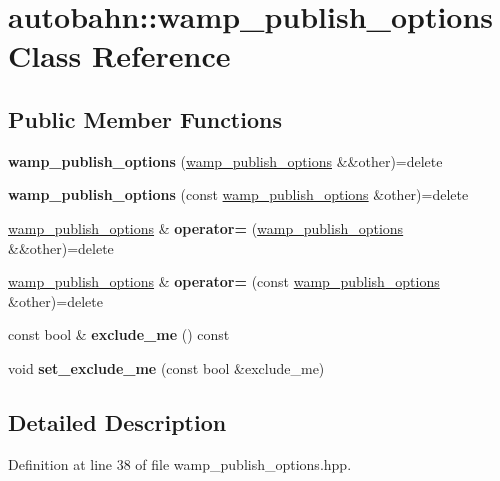 \hypertarget{classautobahn_1_1wamp__publish__options}{}\section{autobahn\+:\+:wamp\+\_\+publish\+\_\+options Class Reference}
\label{classautobahn_1_1wamp__publish__options}
\subsection*{Public Member Functions}
\begin{DoxyCompactItemize}
\item 
{\bfseries wamp\+\_\+publish\+\_\+options} (\hyperlink{classautobahn_1_1wamp__publish__options}{wamp\+\_\+publish\+\_\+options} \&\&other)=delete\hypertarget{classautobahn_1_1wamp__publish__options_afc0f11a40515cb77c1b423d5ec95ab18}{}\label{classautobahn_1_1wamp__publish__options_afc0f11a40515cb77c1b423d5ec95ab18}

\item 
{\bfseries wamp\+\_\+publish\+\_\+options} (const \hyperlink{classautobahn_1_1wamp__publish__options}{wamp\+\_\+publish\+\_\+options} \&other)=delete\hypertarget{classautobahn_1_1wamp__publish__options_a987eee20209a49ecf3480e9770c47931}{}\label{classautobahn_1_1wamp__publish__options_a987eee20209a49ecf3480e9770c47931}

\item 
\hyperlink{classautobahn_1_1wamp__publish__options}{wamp\+\_\+publish\+\_\+options} \& {\bfseries operator=} (\hyperlink{classautobahn_1_1wamp__publish__options}{wamp\+\_\+publish\+\_\+options} \&\&other)=delete\hypertarget{classautobahn_1_1wamp__publish__options_af2b4b7ff246e5c761ab5f7b2f84173ca}{}\label{classautobahn_1_1wamp__publish__options_af2b4b7ff246e5c761ab5f7b2f84173ca}

\item 
\hyperlink{classautobahn_1_1wamp__publish__options}{wamp\+\_\+publish\+\_\+options} \& {\bfseries operator=} (const \hyperlink{classautobahn_1_1wamp__publish__options}{wamp\+\_\+publish\+\_\+options} \&other)=delete\hypertarget{classautobahn_1_1wamp__publish__options_ac9614a06cdd6dc90e3cb24a3a5833b8f}{}\label{classautobahn_1_1wamp__publish__options_ac9614a06cdd6dc90e3cb24a3a5833b8f}

\item 
const bool \& {\bfseries exclude\+\_\+me} () const \hypertarget{classautobahn_1_1wamp__publish__options_a7fb06211e7b0a2bab78742bb55b78ddb}{}\label{classautobahn_1_1wamp__publish__options_a7fb06211e7b0a2bab78742bb55b78ddb}

\item 
void {\bfseries set\+\_\+exclude\+\_\+me} (const bool \&exclude\+\_\+me)\hypertarget{classautobahn_1_1wamp__publish__options_aad04c3ddf7b784ca857d70db30ec7652}{}\label{classautobahn_1_1wamp__publish__options_aad04c3ddf7b784ca857d70db30ec7652}

\end{DoxyCompactItemize}


\subsection{Detailed Description}


Definition at line 38 of file wamp\+\_\+publish\+\_\+options.\+hpp.

